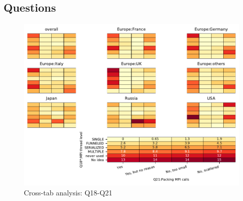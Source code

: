 
\subsection{Questions}


\begin{figure}
\begin{center}
\includegraphics[width=12cm]{../pdfs/Q18-Q21.pdf}
\caption{Cross-tab analysis: Q18-Q21}
\label{fig:Q18-Q21}
\end{center}
\end{figure}
